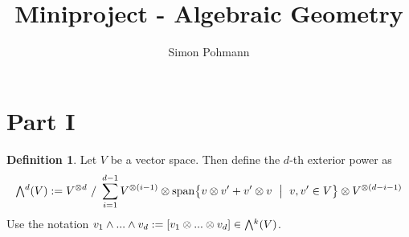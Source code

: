 \documentclass{scrartcl}
\title{Miniproject - Algebraic Geometry}
\author{Simon Pohmann}
\date{}
\newcommand{\extpow}{\mathchoice{{\textstyle\bigwedge}}
    {{\bigwedge}}
    {{\textstyle\wedge}}
    {{\scriptstyle\wedge}}}
\newcommand{\vspan}{\mathrm{span}}
\theoremstyle{definition}
\newtheorem{definition}{Definition}
\begin{document}
\maketitle

\section{Part I}

\begin{definition}
    Let $V$ be a vector space.
    Then define the $d$-th exterior power as
    \begin{equation*}
        \extpow^d(V) := V^{\otimes d} \ / \ \sum_{i = 1}^{d - 1} V^{\otimes (i - 1)} \otimes \vspan\bigl\{ v \otimes v' + v' \otimes v \ \bigm| \ v, v' \in V \bigr\} \otimes V^{\otimes (d - i - 1)}
    \end{equation*}
    Use the notation $v_1 \wedge ... \wedge v_d := [v_1 \otimes ... \otimes v_d] \in \extpow^k(V)$.
\end{definition}
\end{document}
